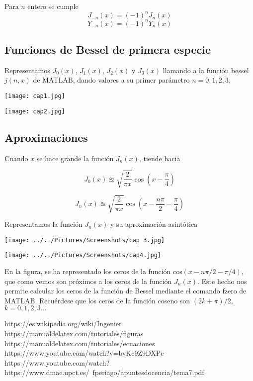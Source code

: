 \documentclass[12pt,a4paper]{article}
\begin{document}
\vspace{0,6cm}
Para $n$ entero se cumple
\vspace{0,6cm}
$$J_{-n}(x)=(-1)^nJ_n(x)$$
$$Y_{-n}(x)=(-1)^n Y_n(x)$$

\vspace{3cm}
\subsection{Funciones de Bessel de primera especie}
Representamos $J_0(x)$, $J_1(x)$, $J_2(x)$ y $J_3(x)$ llamando a la función bessel $j(n,x)$ de MATLAB, dando valores a su primer parámetro $n=0,1,2,3,$

\vspace{0,6cm}
\texttt{[image: cap1.jpg]} 

\vspace{0,6cm}
\texttt{[image: cap2.jpg]} 
\subsection{Aproximaciones}
Cuando $x$ se hace grande la función $J_n(x)$, tiende hacia

\vspace{0,6cm}
\begin{equation*}
J_0(x)\approxeq \sqrt{\frac{2}{\pi x}}\cos (x- \frac{\pi}{4})
\end{equation*}

\begin{equation*}
J_n(x)\approxeq \sqrt{\frac{2}{\pi x}}\cos (x- \frac{n\pi}{2}-\frac{\pi}{4})
\end{equation*}

\vspace{0,6cm}
Representamos la función $J_n(x)$ y su aproximación asintótica

\texttt{[image: ../../Pictures/Screenshots/cap 3.jpg]} 

\texttt{[image: ../../Pictures/Screenshots/cap4.jpg]} 

\vspace{0,6cm}
En la figura, se ha representado los ceros de la función cos$(x-n\pi/2-\pi/4)$, que como vemos son próximos a los ceros de la función $J_n(x)$. Este hecho nos permite calcular los ceros de la función de Bessel mediante el comando fzero de MATLAB. Recuérdese que los ceros de la función coseno son $(2k+\pi)/2$, $k=0,1,2,3...$


\vspace{4cm}
\begin{thebibliography}{10}
https://es.wikipedia.org/wiki/Ingenier%
https://manualdelatex.com/tutoriales/figuras 
https://manualdelatex.com/tutoriales/ecuaciones 
https://www.youtube.com/watch?v=bvKc9Z9DXPc 
https://www.youtube.com/watch?
https://www.dmae.upct.es/~fperiago/apuntesdocencia/tema7.pdf 
\end{thebibliography}
\end{document}
